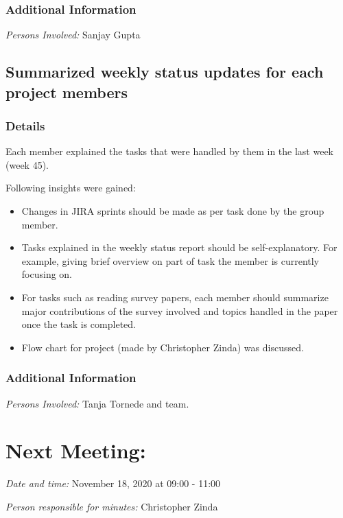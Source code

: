 \documentclass{meetingmins}
\begin{document}
        \subsubsection{Additional Information}
        \begin{hiddensubitems}
            \item
                \textit{Persons Involved: } Sanjay Gupta
        \end{hiddensubitems}        

\subsection{Summarized weekly status updates for each project members}
        \subsubsection{Details}
        \begin{hiddensubitems}
            \item
                Each member explained the tasks that were handled by them in the last week (week 45).
            \item
                Following insights were gained:    
                \begin{itemize}
                    \item Changes in JIRA sprints should be made as per task done by the group member.
                    \item Tasks explained in the weekly status report should be self-explanatory. For example, giving brief overview on part of task the member is currently focusing on. 
                    \item For tasks such as reading survey papers, each member should summarize major contributions of the survey involved and topics handled in the paper once the task is completed. 
                    \item Flow chart for project (made by Christopher Zinda) was discussed.
                \end{itemize}
        \end{hiddensubitems}
        \subsubsection{Additional Information}
        \begin{hiddensubitems}
            \item
                \textit{Persons Involved: } Tanja Tornede and team.
        \end{hiddensubitems}

\section{Next Meeting:} 
        \begin{hiddensubitems}
            \item
                \textit{Date and time: } November 18, 2020 at 09:00 - 11:00
            \item
                \textit{Person responsible for minutes: } Christopher Zinda
        \end{hiddensubitems}        
\end{document}
